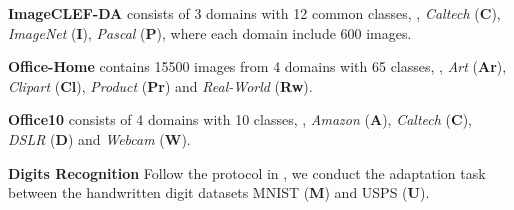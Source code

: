 \documentclass[final]{cvpr}
\begin{document}
\textbf{ImageCLEF-DA} \cite{caputo2014imageclef} consists of 3 domains with 12 common classes, \ie, \textit{Caltech} (\textbf{C}), \textit{ImageNet} (\textbf{I}), \textit{Pascal} (\textbf{P}), where each domain include 600 images.

\textbf{Office-Home} \cite{OfficeHome} contains 15500 images from 4 domains with 65 classes, \ie, \textit{Art} (\textbf{Ar}), \textit{Clipart} (\textbf{Cl}), \textit{Product} (\textbf{Pr}) and \textit{Real-World} (\textbf{Rw}).

\textbf{Office10} \cite{gong2012geodesic} consists of 4 domains with 10 classes, \ie, \textit{Amazon} (\textbf{A}), \textit{Caltech} (\textbf{C}), \textit{DSLR} (\textbf{D}) and \textit{Webcam} (\textbf{W}).

\textbf{Digits Recognition} Follow the protocol in \cite{hoffman2018cycada}, we conduct the adaptation task between the handwritten digit datasets MNIST (\textbf{M}) and USPS (\textbf{U}).

\end{document}
